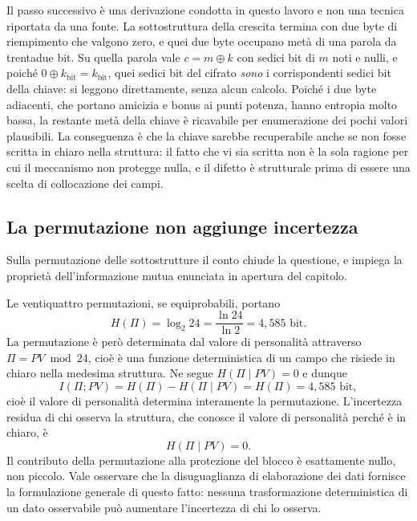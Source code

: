 \begin{daverificare}
Il passo successivo è una derivazione condotta in questo lavoro e non una tecnica riportata da una fonte. La sottostruttura della crescita termina con due byte di riempimento che valgono zero, e quei due byte occupano metà di una parola da trentadue bit. Su quella parola vale $c = m \oplus k$ con sedici bit di $m$ noti e nulli, e poiché $0 \oplus k_{\text{bit}} = k_{\text{bit}}$, quei sedici bit del cifrato \emph{sono} i corrispondenti sedici bit della chiave: si leggono direttamente, senza alcun calcolo. Poiché i due byte adiacenti, che portano amicizia e bonus ai punti potenza, hanno entropia molto bassa, la restante metà della chiave è ricavabile per enumerazione dei pochi valori plausibili. La conseguenza è che la chiave sarebbe recuperabile anche se non fosse scritta in chiaro nella struttura: il fatto che vi sia scritta non è la sola ragione per cui il meccanismo non protegge nulla, e il difetto è strutturale prima di essere una scelta di collocazione dei campi.
\end{daverificare}

\subsection{La permutazione non aggiunge incertezza}

Sulla permutazione delle sottostrutture il conto chiude la questione, e impiega la proprietà dell'informazione mutua enunciata in apertura del capitolo.

Le ventiquattro permutazioni, se equiprobabili, portano
\[
H(\Pi) = \log_2 24 = \frac{\ln 24}{\ln 2} = 4{,}585 \text{ bit}.
\]
La permutazione è però determinata dal valore di personalità attraverso $\Pi = PV \bmod 24$, cioè è una funzione deterministica di un campo che risiede in chiaro nella medesima struttura. Ne segue $H(\Pi \mid PV) = 0$ e dunque
\[
I(\Pi; PV) = H(\Pi) - H(\Pi \mid PV) = H(\Pi) = 4{,}585 \text{ bit},
\]
cioè il valore di personalità determina interamente la permutazione. L'incertezza residua di chi osserva la struttura, che conosce il valore di personalità perché è in chiaro, è
\[
H(\Pi \mid PV) = 0.
\]
Il contributo della permutazione alla protezione del blocco è esattamente nullo, non piccolo. Vale osservare che la disuguaglianza di elaborazione dei dati \cite{cover-thomas} fornisce la formulazione generale di questo fatto: nessuna trasformazione deterministica di un dato osservabile può aumentare l'incertezza di chi lo osserva.

